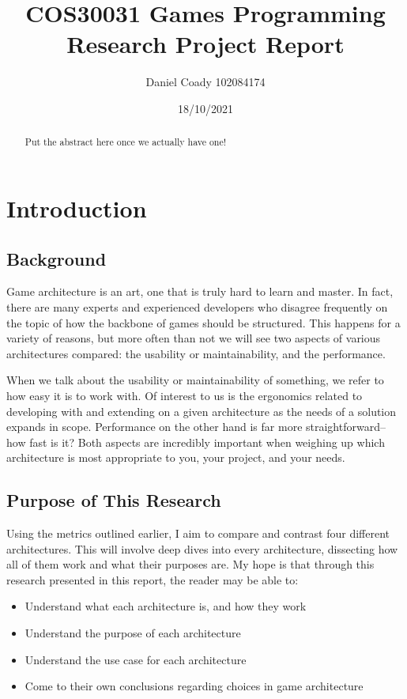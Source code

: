 \documentclass{article}
\title{COS30031 Games Programming\\Research Project Report}
\author{Daniel Coady 102084174}
\date{18/10/2021}
\begin{document}
\maketitle

\pagebreak

\tableofcontents

\pagebreak

\begin{abstract}
    Put the abstract here once we actually have one!
\end{abstract}

\section{Introduction}
\subsection{Background}
Game architecture is an art, one that is truly hard to learn and master. In
fact, there are many experts and experienced developers who disagree frequently
on the topic of how the backbone of games should be structured. This happens for
a variety of reasons, but more often than not we will see two aspects of various
architectures compared: the usability or maintainability, and the performance.

When we talk about the usability or maintainability of something, we refer to
how easy it is to work with. Of interest to us is the ergonomics related to
developing with and extending on a given architecture as the needs of a solution
expands in scope. Performance on the other hand is far more straightforward--how
fast is it? Both aspects are incredibly important when weighing up which
architecture is most appropriate to you, your project, and your needs.

\subsection{Purpose of This Research}
Using the metrics outlined earlier, I aim to compare and contrast four different
architectures. This will involve deep dives into every architecture, dissecting
how all of them work and what their purposes are. My hope is that through this
research presented in this report, the reader may be able to:

\begin{itemize}
    \item Understand what each architecture is, and how they work
    \item Understand the purpose of each architecture
    \item Understand the use case for each architecture
    \item Come to their own conclusions regarding choices in game architecture
\end{itemize}
\end{document}
